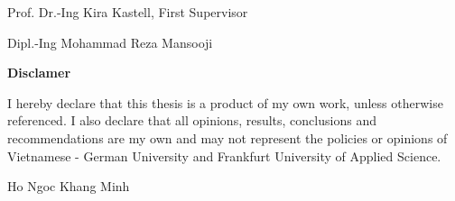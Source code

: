\hspace{7cm}

\hspace{7cm}
Prof. Dr.-Ing Kira Kastell, First Supervisor\\

\vspace{2cm}

\hspace{7cm}

\hspace{7cm}
Dipl.-Ing Mohammad Reza Mansooji

\cleardoublepage %
 


  
  {
  	\begin{center}
  		\Large
  		\bf Disclamer
  	\end{center}
  	{
  		\par
  		I hereby declare that this thesis is a product of my own work, unless otherwise
  		referenced. I also declare that all opinions, results, conclusions and recommendations are
  		my own and may not represent the policies or opinions of Vietnamese - German University and Frankfurt University of Applied Science. \par
  	}
  	\vspace{3cm}
  	\hspace{11cm}
  	Ho Ngoc Khang Minh
  	\cleardoublepage
  }	

\cleardoublepage

\pagestyle{plain}
\setcounter{page}{3}

\cleardoublepage %

